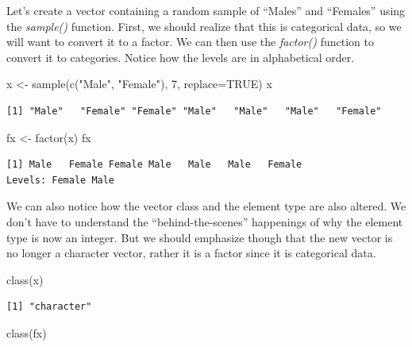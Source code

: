 \documentclass[
  letterpaper,
  DIV=11,
  numbers=noendperiod]{scrreprt}
\newenvironment{Shaded}{\begin{snugshade}}{\end{snugshade}}
\newcommand{\AttributeTok}[1]{\textcolor[rgb]{0.40,0.45,0.13}{#1}}
\newcommand{\ConstantTok}[1]{\textcolor[rgb]{0.56,0.35,0.01}{#1}}
\newcommand{\DecValTok}[1]{\textcolor[rgb]{0.68,0.00,0.00}{#1}}
\newcommand{\FunctionTok}[1]{\textcolor[rgb]{0.28,0.35,0.67}{#1}}
\newcommand{\NormalTok}[1]{\textcolor[rgb]{0.00,0.23,0.31}{#1}}
\newcommand{\OtherTok}[1]{\textcolor[rgb]{0.00,0.23,0.31}{#1}}
\newcommand{\StringTok}[1]{\textcolor[rgb]{0.13,0.47,0.30}{#1}}
\begin{document}
Let's create a vector containing a random sample of ``Males'' and
``Females'' using the \emph{sample()} function. First, we should realize
that this is categorical data, so we will want to convert it to a
factor. We can then use the \emph{factor()} function to convert it to
categories. Notice how the levels are in alphabetical order.

\begin{Shaded}
\begin{Highlighting}[]
\NormalTok{x }\OtherTok{\textless{}{-}} \FunctionTok{sample}\NormalTok{(}\FunctionTok{c}\NormalTok{(}\StringTok{"Male"}\NormalTok{, }\StringTok{"Female"}\NormalTok{), }\DecValTok{7}\NormalTok{, }\AttributeTok{replace=}\ConstantTok{TRUE}\NormalTok{)}
\NormalTok{x}
\end{Highlighting}
\end{Shaded}

\begin{verbatim}
[1] "Male"   "Female" "Female" "Male"   "Male"   "Male"   "Female"
\end{verbatim}

\begin{Shaded}
\begin{Highlighting}[]
\NormalTok{fx }\OtherTok{\textless{}{-}} \FunctionTok{factor}\NormalTok{(x)}
\NormalTok{fx}
\end{Highlighting}
\end{Shaded}

\begin{verbatim}
[1] Male   Female Female Male   Male   Male   Female
Levels: Female Male
\end{verbatim}

We can also notice how the vector class and the element type are also
altered. We don't have to understand the ``behind-the-scenes''
happenings of why the element type is now an integer. But we should
emphasize though that the new vector is no longer a character vector,
rather it is a factor since it is categorical data.

\begin{Shaded}
\begin{Highlighting}[]
\FunctionTok{class}\NormalTok{(x)}
\end{Highlighting}
\end{Shaded}

\begin{verbatim}
[1] "character"
\end{verbatim}

\begin{Shaded}
\begin{Highlighting}[]
\FunctionTok{class}\NormalTok{(fx)}
\end{Highlighting}
\end{Shaded}
\end{document}
